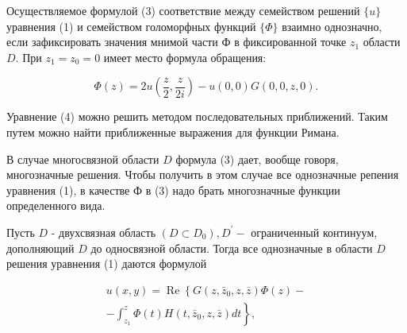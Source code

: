\documentclass[10pt]{article}
\begin{document}
Осуществляемое формулой (3) соответствие между семейством решений $\{u\}$ уравнения (1) и семейством голоморфных функций $\{\Phi\}$ взаимно однозначно, если зафиксировать значения мнимой части Ф в фиксированной точке $z_{1}$ области $D$. При $z_{1}=z_{0}=0$ имеет место формула обращения:



\[

\Phi(z)=2 u\left(\frac{z}{2}, \frac{z}{2 i}\right)-u(0,0) G(0,0, z, 0) .

\]



Уравнение (4) можно решить методом последовательных приближений. Таким путем можно найти приближенные выражения для функции Римана.



В случае многосвязной области $D$ формула (3) дает, вообще говоря, многозначные решения. Чтобы получить в этом случае все однозначные репения уравнения (1), в качестве Ф в (3) надо брать многозначные функции определенного вида.



Пусть $D$ - двухсвязная область $\left(D \subset D_{0}\right), D^{\prime}-$ ограниченный континуум, дополняющий $D$ до односвязной области. Тогда все однозначные в области $D$ решения уравнения (1) даются формулой



\[

\begin{gathered}

u(x, y)=\operatorname{Re}\left\{G\left(z, \bar{z}_{0}, z, \bar{z}\right) \Phi(z)-\right. \\

\left.-\int_{z_{1}}^{z} \Phi(t) H\left(t, \bar{z}_{0}, z, \bar{z}\right) d t\right\},

\end{gathered}

\]
\end{document}
